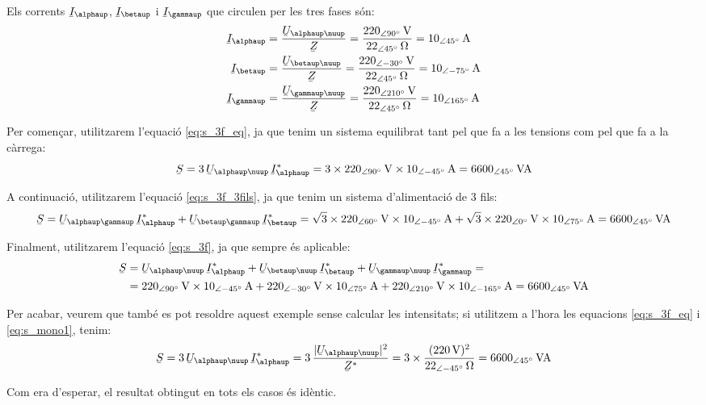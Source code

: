 \begin{exemple}
    Els corrents $\cmplx{I}_\alphaup$, $\cmplx{I}_\betaup$ i $\cmplx{I}_\gammaup$ que
    circulen  per les tres fases s\'{o}n:
    \begin{align*}
        \cmplx{I}_\alphaup &=\frac{\cmplx{U}_{\alphaup\nuup}}{\cmplx{Z}} =
        \frac{220_{\angle 90\degree}\unit{V}}{22_{\angle
    45\degree}\unit{\ohm}} =
        10_{\angle 45\degree}\unit{A}\\
        \cmplx{I}_\betaup &=\frac{\cmplx{U}_{\betaup\nuup}}{\cmplx{Z}} =
        \frac{220_{\angle -30\degree}\unit{V}}{22_{\angle
    45\degree}\unit{\ohm}} =
        10_{\angle -75\degree}\unit{A}\\
        \cmplx{I}_\gammaup &=\frac{\cmplx{U}_{\gammaup\nuup}}{\cmplx{Z}} =
        \frac{220_{\angle 210\degree}\unit{V}}{22_{\angle
    45\degree}\unit{\ohm} } =
        10_{\angle 165\degree}\unit{A}
    \end{align*}


    Per comen\c{c}ar,  utilitzarem l'equaci\'{o} \eqref{eq:s_3f_eq}, ja que tenim
    un sistema equilibrat tant pel que fa a les tensions com pel que fa a la c\`{a}rrega:
    \[
    \cmplx{S} = 3\,\cmplx{U}_{\alphaup\nuup} \,\cmplx{I}_\alphaup^* =
    3\times 220_{\angle 90\degree}\unit{V} \times
    10_{\angle -45\degree}\unit{A} = 6600_{\angle 45\degree}\unit{VA}
    \]

    A continuaci\'{o},  utilitzarem l'equaci\'{o} \eqref{eq:s_3f_3fils}, ja que tenim
    un sistema d'alimentaci\'{o} de 3 fils:
    \[
    \cmplx{S} = \cmplx{U}_{\alphaup\gammaup} \,\cmplx{I}_\alphaup^*
     +  \cmplx{U}_{\betaup\gammaup} \,\cmplx{I}_\betaup^* =
    \sqrt{3}\times 220_{\angle 60\degree}\unit{V} \times
    10_{\angle -45\degree}\unit{A} + \sqrt{3}\times 220_{\angle 0\degree}\unit{V}
    \times 10_{\angle 75\degree}\unit{A}  = 6600_{\angle 45\degree}\unit{VA}
    \]

     Finalment,  utilitzarem l'equaci\'{o} \eqref{eq:s_3f}, ja que
     sempre \'{e}s aplicable:
     \[\begin{split}
     \cmplx{S} &=  \cmplx{U}_{\alphaup\nuup} \,\cmplx{I}_\alphaup^* +
     \cmplx{U}_{\betaup\nuup} \,\cmplx{I}_\betaup^* +  \cmplx{U}_{\gammaup\nuup}\,
     \cmplx{I}_\gammaup^* =\\
     &= 220_{\angle 90\degree}\unit{V}
     \times 10_{\angle -45\degree}\unit{A} + 220_{\angle
     -30\degree}\unit{V} \times 10_{\angle 75\degree}\unit{A}
     + 220_{\angle 210\degree}\unit{V} \times 10_{\angle
     -165\degree}\unit{A} =6600_{\angle 45\degree}\unit{VA}
     \end{split} \]

    Per acabar, veurem que tamb\'{e} es pot resoldre aquest exemple
    sense calcular les intensitats; si utilitzem a l'hora les
    equacions \eqref{eq:s_3f_eq} i \eqref{eq:s_mono1}, tenim:
    \[
    \cmplx{S} = 3\,\cmplx{U}_{\alphaup\nuup} \,\cmplx{I}_\alphaup^* = 3\,
    \frac{|\cmplx{U}_{\alphaup\nuup}|^2}{\cmplx{Z}^*} =
    3\times\frac{(220\unit{V})^2}{22_{\angle
    -45\degree}\unit{\ohm}} = 6600_{\angle 45\degree}\unit{VA}
    \]

    Com era d'esperar, el resultat obtingut en tots els casos
    \'{e}s id\`{e}ntic.
\end{exemple}

